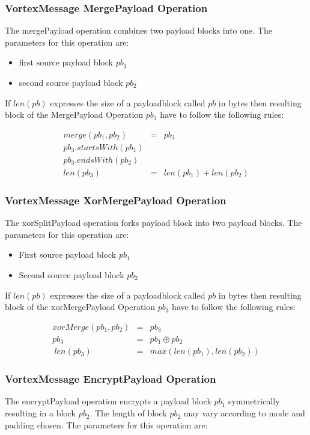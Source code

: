 \subsubsection{VortexMessage MergePayload Operation}
The mergePayload operation combines two payload blocks into one. The parameters for this operation are:

\begin{itemize}
	\item first source payload block $pb_1$
	\item second source payload block $pb_2$
\end{itemize}

If $len(pb)$ expresses the size of a payloadblock called $pb$ in bytes then resulting block of the MergePayload Operation $pb_3$ have to follow the following rules:

\begin{eqnarray}
merge(pb_1, pb_2) & = & pb_3 \\
pb_3.startsWith(pb_1)\\
pb_3.endsWith(pb_2)\\
len(pb_3) & = & len(pb_1) + len(pb_2)
\end{eqnarray}

\subsubsection{VortexMessage XorMergePayload Operation}
The xorSplitPayload operation forks payload block into two payload blocks. The parameters for this operation are:

\begin{itemize}
	\item First source payload block $pb_1$
	\item Second source payload block $pb_2$
\end{itemize}

If $len(pb)$ expresses the size of a payloadblock called $pb$ in bytes then resulting block of the xorMergePayload Operation $pb_3$ have to follow the following rules:

\begin{eqnarray}
xorMerge(pb_1, pb_2) & = & pb_3 \\
pb_3 & = & pb_1 \oplus pb_2\\\
len(pb_3) & = & max( len(pb_1), len(pb_2) )
\end{eqnarray}


\subsubsection{VortexMessage EncryptPayload Operation}
The encryptPayload operation encrypts a payload block $pb_1$ symmetrically resulting in a block $pb_2$. The length of block $pb_2$ may vary according to mode and padding chosen. The parameters for this operation are:

